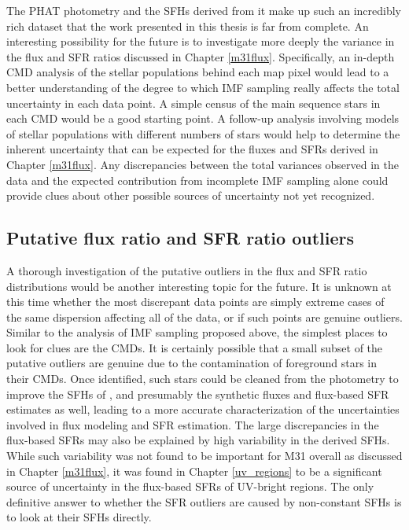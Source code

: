 The PHAT photometry and the SFHs derived from it make up such an incredibly
rich dataset that the work presented in this thesis is far from complete. An
interesting possibility for the future is to investigate more deeply the
variance in the flux and SFR ratios discussed in Chapter \ref{m31flux}.
Specifically, an in-depth CMD analysis of the stellar populations behind each
map pixel would lead to a better understanding of the degree to which IMF
sampling really affects the total uncertainty in each data point. A simple
census of the main sequence stars in each CMD would be a good starting point. A
follow-up analysis involving models of stellar populations with different
numbers of stars would help to determine the inherent uncertainty that can be
expected for the fluxes and SFRs derived in Chapter \ref{m31flux}. Any
discrepancies between the total variances observed in the data and the expected
contribution from incomplete IMF sampling alone could provide clues about other
possible sources of uncertainty not yet recognized.


\subsection{Putative flux ratio and SFR ratio outliers}

A thorough investigation of the putative outliers in the flux and SFR ratio
distributions would be another interesting topic for the future. It is unknown
at this time whether the most discrepant data points are simply extreme cases
of the same dispersion affecting all of the data, or if such points are genuine
outliers. Similar to the analysis of IMF sampling proposed above, the simplest
places to look for clues are the CMDs. It is certainly possible that a small
subset of the putative outliers are genuine due to the contamination of
foreground stars in their CMDs. Once identified, such stars could be cleaned
from the photometry to improve the SFHs of \citet{Lewis:2014}, and presumably
the synthetic fluxes and flux-based SFR estimates as well, leading to a more
accurate characterization of the uncertainties involved in flux modeling and
SFR estimation. The large discrepancies in the flux-based SFRs may also be
explained by high variability in the derived SFHs. While such variability was
not found to be important for M31 overall as discussed in Chapter
\ref{m31flux}, it was found in Chapter \ref{uv_regions} to be a significant
source of uncertainty in the flux-based SFRs of UV-bright regions. The only
definitive answer to whether the SFR outliers are caused by non-constant SFHs
is to look at their SFHs directly.


